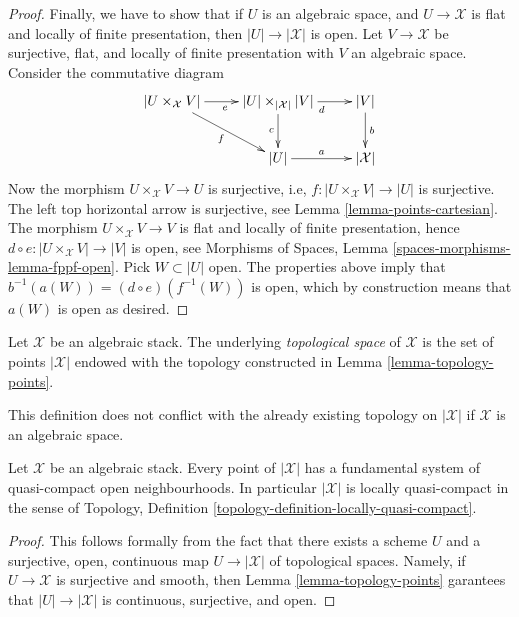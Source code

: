 \begin{proof}
\medskip\noindent
Finally, we have to show that if $U$ is an algebraic space, and
$U \to \mathcal{X}$ is flat and locally of finite presentation, then
$|U| \to |\mathcal{X}|$ is open. Let $V \to \mathcal{X}$ be surjective,
flat, and locally of finite presentation with $V$ an algebraic space.
Consider the commutative diagram
$$
\xymatrix{
|U \times_{\mathcal{X}} V| \ar[r]_e \ar[rd]_f &
|U| \times_{|\mathcal{X}|} |V| \ar[d]_c \ar[r]_d &
|V| \ar[d]^b \\
& |U| \ar[r]^a & |\mathcal{X}|
}
$$
Now the morphism $U \times_{\mathcal{X}} V \to U$ is surjective, i.e,
$f : |U \times_{\mathcal{X}} V| \to |U|$ is surjective.
The left top horizontal arrow is surjective, see
Lemma \ref{lemma-points-cartesian}.
The morphism $U \times_{\mathcal{X}} V \to V$ is flat and locally of finite
presentation, hence $d \circ e : |U \times_{\mathcal{X}} V| \to |V|$ is open,
see
Morphisms of Spaces, Lemma \ref{spaces-morphisms-lemma-fppf-open}.
Pick $W \subset |U|$ open. The properties above imply that
$b^{-1}(a(W)) = (d \circ e)(f^{-1}(W))$ is open, which by construction means
that $a(W)$ is open as desired.
\end{proof}

\begin{definition}
\label{definition-topological-space}
Let $\mathcal{X}$ be an algebraic stack.
The underlying {\it topological space} of $\mathcal{X}$ is the set of points
$|\mathcal{X}|$ endowed with the topology constructed in
Lemma \ref{lemma-topology-points}.
\end{definition}

\noindent
This definition does not conflict with the already existing topology
on $|\mathcal{X}|$ if $\mathcal{X}$ is an algebraic space.

\begin{lemma}
\label{lemma-space-locally-quasi-compact}
Let $\mathcal{X}$ be an algebraic stack.
Every point of $|\mathcal{X}|$ has a fundamental system of
quasi-compact open neighbourhoods.
In particular $|\mathcal{X}|$ is locally quasi-compact in the sense of
Topology, Definition \ref{topology-definition-locally-quasi-compact}.
\end{lemma}

\begin{proof}
This follows formally from the fact that there exists a scheme
$U$ and a surjective, open, continuous map $U \to |\mathcal{X}|$
of topological spaces. Namely, if $U \to \mathcal{X}$ is surjective and
smooth, then
Lemma \ref{lemma-topology-points}
garantees that $|U| \to |\mathcal{X}|$ is continuous, surjective, and open.
\end{proof}











